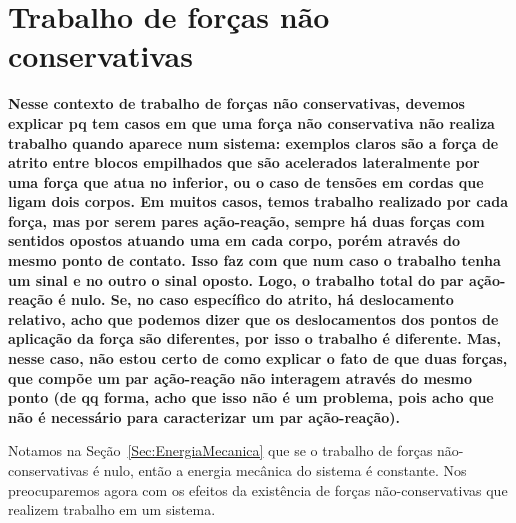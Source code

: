


\section{Trabalho de forças não conservativas}
\label{Sec:TrabalhoForcasNaoConservativas}

\textbf{Nesse contexto de trabalho de forças não conservativas, devemos explicar pq tem casos em que uma força não conservativa não realiza trabalho quando aparece num sistema: exemplos claros são a força de atrito entre blocos empilhados que são acelerados lateralmente por uma força que atua no inferior, ou o caso de tensões em cordas que ligam dois corpos. Em muitos casos, temos trabalho realizado por cada força, mas por serem pares ação-reação, sempre há duas forças com sentidos opostos atuando uma em cada corpo, porém através do mesmo ponto de contato. Isso faz com que num caso o trabalho tenha um sinal e no outro o sinal oposto. Logo, o trabalho total do par ação-reação é nulo. Se, no caso específico do atrito, há deslocamento relativo, acho que podemos dizer que os deslocamentos dos pontos de aplicação da força são diferentes, por isso o trabalho é diferente. Mas, nesse caso, não estou certo de como explicar o fato de que duas forças, que compõe um par ação-reação não interagem através do mesmo ponto (de qq forma, acho que isso não é um problema, pois acho que não é necessário para caracterizar um par ação-reação).}

Notamos na Seção~\ref{Sec:EnergiaMecanica} que se o trabalho de forças não-conservativas é nulo, então a energia mecânica do sistema é constante. Nos preocuparemos agora com os efeitos da existência de forças não-conservativas que realizem trabalho em um sistema.

